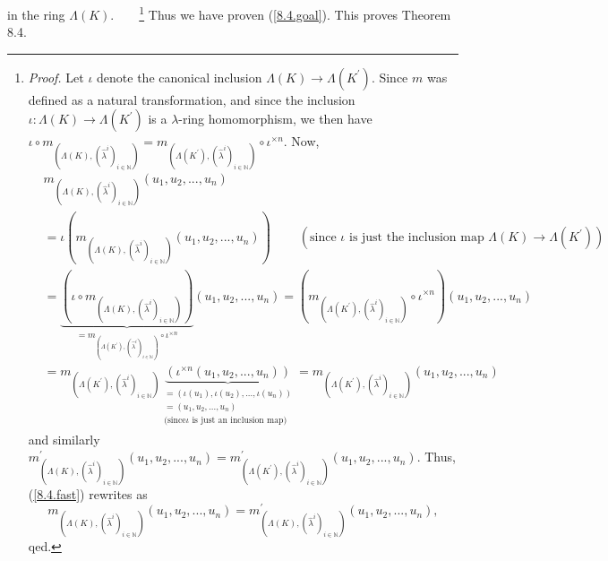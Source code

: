 \documentclass[numbers=enddot,12pt,final,onecolumn,notitlepage]{scrartcl}%
\begin{document}
in the ring $\Lambda\left(  K\right)  $.\ \ \ \ \footnote{\textit{Proof.} Let
$\iota$ denote the canonical inclusion $\Lambda\left(  K\right)
\rightarrow\Lambda\left(  K^{\prime}\right)  $. Since $m$ was defined as a
natural transformation, and since the inclusion $\iota:\Lambda\left(
K\right)  \rightarrow\Lambda\left(  K^{\prime}\right)  $ is a $\lambda$-ring
homomorphism, we then have $\iota\circ m_{\left(  \Lambda\left(  K\right)
,\left(  \widehat{\lambda}^{i}\right)  _{i\in\mathbb{N}}\right)  }=m_{\left(
\Lambda\left(  K^{\prime}\right)  ,\left(  \widehat{\lambda}^{i}\right)
_{i\in\mathbb{N}}\right)  }\circ\iota^{\times n}$. Now,%
\begin{align*}
&  m_{\left(  \Lambda\left(  K\right)  ,\left(  \widehat{\lambda}^{i}\right)
_{i\in\mathbb{N}}\right)  }\left(  u_{1},u_{2},...,u_{n}\right) \\
&  =\iota\left(  m_{\left(  \Lambda\left(  K\right)  ,\left(  \widehat{\lambda
}^{i}\right)  _{i\in\mathbb{N}}\right)  }\left(  u_{1},u_{2},...,u_{n}\right)
\right)  \ \ \ \ \ \ \ \ \ \ \left(  \text{since }\iota\text{ is just the
inclusion map }\Lambda\left(  K\right)  \rightarrow\Lambda\left(  K^{\prime
}\right)  \right) \\
&  =\underbrace{\left(  \iota\circ m_{\left(  \Lambda\left(  K\right)
,\left(  \widehat{\lambda}^{i}\right)  _{i\in\mathbb{N}}\right)  }\right)
}_{=m_{\left(  \Lambda\left(  K^{\prime}\right)  ,\left(  \widehat{\lambda
}^{i}\right)  _{i\in\mathbb{N}}\right)  }\circ\iota^{\times n}}\left(
u_{1},u_{2},...,u_{n}\right)  =\left(  m_{\left(  \Lambda\left(  K^{\prime
}\right)  ,\left(  \widehat{\lambda}^{i}\right)  _{i\in\mathbb{N}}\right)
}\circ\iota^{\times n}\right)  \left(  u_{1},u_{2},...,u_{n}\right) \\
&  =m_{\left(  \Lambda\left(  K^{\prime}\right)  ,\left(  \widehat{\lambda
}^{i}\right)  _{i\in\mathbb{N}}\right)  }\underbrace{\left(  \iota^{\times
n}\left(  u_{1},u_{2},...,u_{n}\right)  \right)  }_{\substack{=\left(
\iota\left(  u_{1}\right)  ,\iota\left(  u_{2}\right)  ,...,\iota\left(
u_{n}\right)  \right)  \\=\left(  u_{1},u_{2},...,u_{n}\right)  \\\text{(since
}\iota\text{ is just an inclusion map)}}}=m_{\left(  \Lambda\left(  K^{\prime
}\right)  ,\left(  \widehat{\lambda}^{i}\right)  _{i\in\mathbb{N}}\right)
}\left(  u_{1},u_{2},...,u_{n}\right)
\end{align*}
and similarly $m_{\left(  \Lambda\left(  K\right)  ,\left(  \widehat{\lambda
}^{i}\right)  _{i\in\mathbb{N}}\right)  }^{\prime}\left(  u_{1},u_{2}%
,...,u_{n}\right)  =m_{\left(  \Lambda\left(  K^{\prime}\right)  ,\left(
\widehat{\lambda}^{i}\right)  _{i\in\mathbb{N}}\right)  }^{\prime}\left(
u_{1},u_{2},...,u_{n}\right)  $. Thus, (\ref{8.4.fast}) rewrites as
\[
m_{\left(  \Lambda\left(  K\right)  ,\left(  \widehat{\lambda}^{i}\right)
_{i\in\mathbb{N}}\right)  }\left(  u_{1},u_{2},...,u_{n}\right)  =m_{\left(
\Lambda\left(  K\right)  ,\left(  \widehat{\lambda}^{i}\right)  _{i\in
\mathbb{N}}\right)  }^{\prime}\left(  u_{1},u_{2},...,u_{n}\right)  ,
\]
qed.} Thus we have proven (\ref{8.4.goal}). This proves Theorem 8.4.
\end{document}
